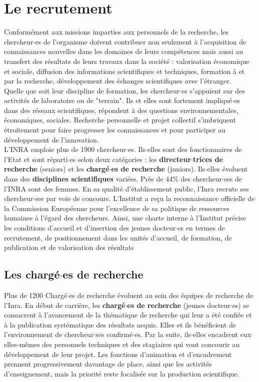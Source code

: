 \section{ Le recrutement}
Conform\'ement aux missions imparties aux personnels de la recherche, les chercheur$\cdot$es de l'organisme doivent contribuer non seulement \`a l'acquisition de connaissances nouvelles dans les domaines de leurs comp\'etences mais aussi au transfert des r\'esultats de leurs travaux dans la soci\'et\'e : valorisation \'economique et sociale, diffusion des informations scientifiques et techniques, formation \`a et par la recherche, d\'eveloppement des \'echanges scientifiques avec l'\'etranger.\\ 
Quelle que soit leur discipline de formation, les chercheur$\cdot$es s'appuient sur des activit\'es de laboratoire ou de "terrain". Ils et elles sont fortement impliqu\'e$\cdot$es dans des r\'eseaux scientifiques, r\'epondent \`a des questions environnementales, \'economiques, sociales. Recherche personnelle et projet collectif s'imbriquent \'etroitement pour faire progresser les connaissances et pour participer au d\'eveloppement de l'innovation.\\

L'INRA emploie plus de 1900 chercheur$\cdot$es. Ils$\cdot$elles sont des fonctionnaires de l'Etat et sont r\'eparti$\cdot$es selon deux cat\'egories : les {\bf directeur$\cdot$trices de recherche} (seniors) et les {\bf charg\'e$\cdot$es de recherche} (juniors). Ils$\cdot$elles \'evoluent dans des {\bf disciplines scientifiques} vari\'ees. Pr\`es de 44\% des chercheur$\cdot$ses de l'INRA sont des femmes. En sa qualit\'e d'\'etablissement public, l'Inra recrute ses chercheur$\cdot$ses par voie de concours. L'Institut a re\c{c}u la reconnaissance officielle de la  Commission Europ\'eenne pour l'excellence de sa  politique de ressources humaines \`a l'\'egard des  chercheurs. Ainsi, une  charte interne \`a l'Institut  pr\'ecise les conditions d'accueil et d'insertion des jeunes  docteur$\cdot$es en termes de recrutement, de positionnement dans  les unit\'es d'accueil, de formation, de publication  et  de valorisation des r\'esultats

\subsection{ Les charg\'e$\cdot$es de recherche}
Plus de 1200 Charg\'e$\cdot$es de recherche \'evoluent au sein des \'equipes de recherche de l'Inra. En d\'ebut de carri\`ere, les {\bf charg\'e$\cdot$es de recherche} (jeunes docteur$\cdot$es) se consacrent \`a l'avancement de la th\'ematique de recherche qui leur a \'et\'e confi\'ee et \`a la publication syst\'ematique des r\'esultats acquis. Elles et ils b\'en\'eficient de l'environnement de chercheur$\cdot$ses confirm\'e$\cdot$es. Par la suite, ils$\cdot$elles encadrent eux$\cdot$elles-m\^emes des personnels techniques et des stagiaires qui vont concourir au d\'eveloppement de leur projet. Les fonctions d'animation et d'encadrement prennent progressivement davantage de place, ainsi que les activit\'es d'enseignement, mais la priorit\'e reste focalis\'ee sur la production scientifique.\\

